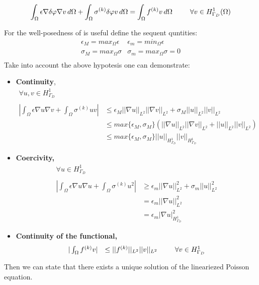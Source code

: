 \begin{equation}
\label{eq: NLP weakformulation}
\int_{\Omega} \epsilon \nabla \delta\varphi \nabla v \, d\Omega + \int_{\Omega} \sigma^{(k)}\delta \varphi v \, d\Omega = \int_{\Omega} f^{(k)}v \, d\Omega \psp{15} \forall v \in H^1_{\Gamma_D}(\Omega)
\end{equation}

For the well-posedness of  is useful define the sequent quntities:
\begin{equation*}
\begin{array}{ll}
\epsilon_M = max_{\Omega} \epsilon & \epsilon_m = min_{\Omega} \epsilon \\
\sigma_M = max_{\Omega} \sigma & \sigma_m = max_{\Omega} \sigma = 0 \\
\end{array}
\end{equation*}
Take into account the above hypotesis one can demonstrate:
\begin{itemize}
\item \textbf{Continuity},
\begin{equation*}
\begin{array}{ll}
\forall u,v \in H^1_{\Gamma_D} &\\ \\
|\int_{\Omega} \epsilon \nabla u \nabla v + \int_{\Omega} \sigma^{(k)}u v| 
& \leq \epsilon_{M} ||\nabla u ||_{L^2} || \nabla v ||_{L^2} +  \sigma_{M} ||u ||_{L^2} ||v ||_{L^2} 
\\
& \leq max\{\epsilon_{M}, \sigma_{M} \}  
\left( ||\nabla u ||_{L^2} || \nabla v ||_{L^2} +   ||u ||_{L^2} ||v ||_{L^2} \right)
\\
& \leq max\{\epsilon_{M}, \sigma_{M} \}  
||u ||_{H^1_{\Gamma_D}} || v ||_{H^1_{\Gamma_D}}
\end{array}
\end{equation*}

\item \textbf{Coercivity,}
\begin{equation*}
\begin{array}{ll}
\forall u \in H^1_{\Gamma_D} &\\ \\
|\int_{\Omega} \epsilon \nabla u \nabla u + \int_{\Omega} \sigma^{(k)}u^2| 
& \geq \epsilon_{m} ||\nabla u ||_{L^2}^2  +  \sigma_{m} ||u ||_{L^2}^2 
\\
& =  \epsilon_{m} ||\nabla u ||_{L^2}^2 
\\
& = \epsilon_{m} |\nabla u |_{H^1_{\Gamma_D}}^2 
\end{array}
\end{equation*}

\item \textbf{Continuity of the functional,}
\begin{equation*}
\begin{array}{ll}
|\int_{\Omega} f^{(k)} v |
& \leq ||f^{(k)} ||_{L^2}||v ||_{L^2} \psp{15} \forall v \in H^1_{\Gamma_D}
\end{array}
\end{equation*}
\end{itemize}

Then we can state that there exists a unique solution of the lineariezed Poisson equation.